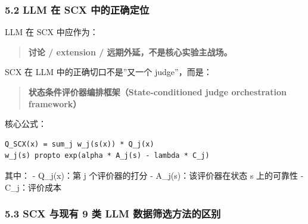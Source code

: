 \documentclass[
  12pt,
]{ctexart}
\begin{document}
\subsubsection{5.2 LLM 在 SCX
中的正确定位}\label{llm-ux5728-scx-ux4e2dux7684ux6b63ux786eux5b9aux4f4d}

LLM 在 SCX 中应作为：

\begin{quote}
\textbf{讨论 / extension / 远期外延，不是核心实验主战场。}
\end{quote}

SCX 在 LLM 中的正确切口不是''又一个 judge''，而是：

\begin{quote}
\textbf{状态条件评价器编排框架（State-conditioned judge orchestration
framework）}
\end{quote}

核心公式：

\begin{verbatim}
Q_SCX(x) = sum_j w_j(s(x)) * Q_j(x)
w_j(s) propto exp(alpha * A_j(s) - lambda * C_j)
\end{verbatim}

其中： - Q\_j(x)：第 j 个评价器的打分 - A\_j(s)：该评价器在状态 s
上的可靠性 - C\_j：评价成本

\subsubsection{5.3 SCX 与现有 9 类 LLM
数据筛选方法的区别}\label{scx-ux4e0eux73b0ux6709-9-ux7c7b-llm-ux6570ux636eux7b5bux9009ux65b9ux6cd5ux7684ux533aux522b}
\end{document}
